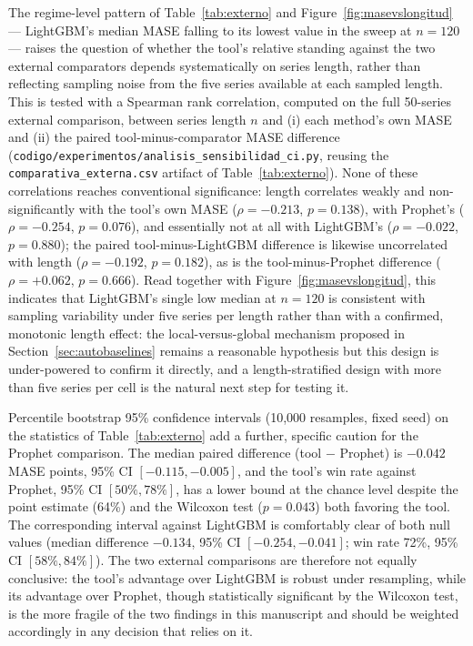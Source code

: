 \documentclass[forecasting,article,submit,pdftex,moreauthors]{Definitions/mdpi}
\begin{document}
The regime-level pattern of Table~\ref{tab:externo} and Figure~\ref{fig:masevslongitud} --- LightGBM's median MASE falling to its lowest value in the sweep at $n=120$ --- raises the question of whether the tool's relative standing against the two external comparators depends systematically on series length, rather than reflecting sampling noise from the five series available at each sampled length. This is tested with a Spearman rank correlation, computed on the full 50-series external comparison, between series length $n$ and (i) each method's own MASE and (ii) the paired tool-minus-comparator MASE difference (\texttt{codigo/\allowbreak experimentos/\allowbreak analisis\_\allowbreak sensibilidad\_\allowbreak ci.py}, reusing the \texttt{comparativa\_\allowbreak externa.csv} artifact of Table~\ref{tab:externo}). None of these correlations reaches conventional significance: length correlates weakly and non-significantly with the tool's own MASE ($\rho=-0.213$, $p=0.138$), with Prophet's ($\rho=-0.254$, $p=0.076$), and essentially not at all with LightGBM's ($\rho=-0.022$, $p=0.880$); the paired tool-minus-LightGBM difference is likewise uncorrelated with length ($\rho=-0.192$, $p=0.182$), as is the tool-minus-Prophet difference ($\rho=+0.062$, $p=0.666$). Read together with Figure~\ref{fig:masevslongitud}, this indicates that LightGBM's single low median at $n=120$ is consistent with sampling variability under five series per length rather than with a confirmed, monotonic length effect: the local-versus-global mechanism proposed in Section~\ref{sec:autobaselines} remains a reasonable hypothesis but this design is under-powered to confirm it directly, and a length-stratified design with more than five series per cell is the natural next step for testing it.

Percentile bootstrap 95\% confidence intervals (10,000 resamples, fixed seed) on the statistics of Table~\ref{tab:externo} add a further, specific caution for the Prophet comparison. The median paired difference (tool $-$ Prophet) is $-0.042$ MASE points, 95\% CI $[-0.115, -0.005]$, and the tool's win rate against Prophet, 95\% CI $[50\%, 78\%]$, has a lower bound at the chance level despite the point estimate (64\%) and the Wilcoxon test ($p=0.043$) both favoring the tool. The corresponding interval against LightGBM is comfortably clear of both null values (median difference $-0.134$, 95\% CI $[-0.254,-0.041]$; win rate 72\%, 95\% CI $[58\%,84\%]$). The two external comparisons are therefore not equally conclusive: the tool's advantage over LightGBM is robust under resampling, while its advantage over Prophet, though statistically significant by the Wilcoxon test, is the more fragile of the two findings in this manuscript and should be weighted accordingly in any decision that relies on it.
\end{document}

